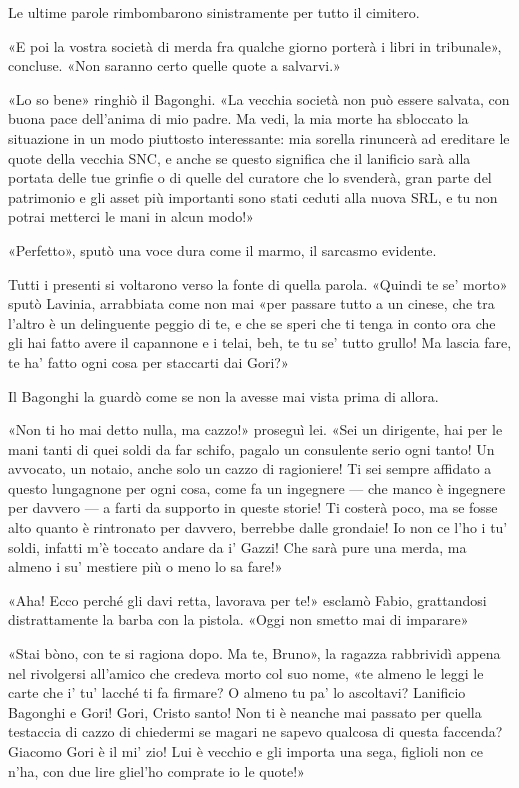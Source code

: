 Le ultime parole rimbombarono sinistramente per tutto il cimitero.

«E poi la vostra società di merda fra qualche giorno porterà i libri in tribunale», concluse. «Non saranno certo quelle quote a salvarvi.»

«Lo so bene» ringhiò il Bagonghi. «La vecchia società non può essere salvata, con buona pace dell'anima di mio padre. Ma vedi, la mia morte ha sbloccato la situazione in un modo piuttosto interessante: mia sorella rinuncerà ad ereditare le quote della vecchia SNC, e anche se questo significa che il lanificio sarà alla portata delle tue grinfie o di quelle del curatore che lo svenderà, gran parte del patrimonio e gli asset più importanti sono stati ceduti alla nuova SRL, e tu non potrai metterci le mani in alcun modo!»

«Perfetto», sputò una voce dura come il marmo, il sarcasmo evidente.

Tutti i presenti si voltarono verso la fonte di quella parola. «Quindi te se' morto» sputò Lavinia, arrabbiata come non mai «per passare tutto a un cinese, che tra l'altro è un delinguente peggio di te, e che se speri che ti tenga in conto ora che gli hai fatto avere il capannone e i telai, beh, te tu se' tutto grullo! Ma lascia fare, te ha' fatto ogni cosa per staccarti dai Gori?»

Il Bagonghi la guardò come se non la avesse mai vista prima di allora.

«Non ti ho mai detto nulla, ma cazzo!» proseguì lei. «Sei un dirigente, hai per le mani tanti di quei soldi da far schifo, pagalo un consulente serio ogni tanto! Un avvocato, un notaio, anche solo un cazzo di ragioniere! Ti sei sempre affidato a questo lungagnone per ogni cosa, come fa un ingegnere --- che manco è ingegnere per davvero --- a farti da supporto in queste storie! Ti costerà poco, ma se fosse alto quanto è rintronato per davvero, berrebbe dalle grondaie! Io non ce l'ho i tu' soldi, infatti m'è toccato andare da i' Gazzi! Che sarà pure una merda, ma almeno i su' mestiere più o meno lo sa fare!»

«Aha! Ecco perché gli davi retta, lavorava per te!» esclamò Fabio, grattandosi distrattamente la barba con la pistola. «Oggi non smetto mai di imparare»

«Stai bòno, con te si ragiona dopo. Ma te, Bruno», la ragazza rabbrividì appena nel rivolgersi all'amico che credeva morto col suo nome, «te almeno le leggi le carte che i' tu' lacché ti fa firmare? O almeno tu pa' lo ascoltavi? Lanificio Bagonghi e Gori! Gori, Cristo santo! Non ti è neanche mai passato per quella testaccia di cazzo di chiedermi se magari ne sapevo qualcosa di questa faccenda? Giacomo Gori è il mi' zio! Lui è vecchio e gli importa una sega, figlioli non ce n'ha, con due lire gliel'ho comprate io le quote!»

